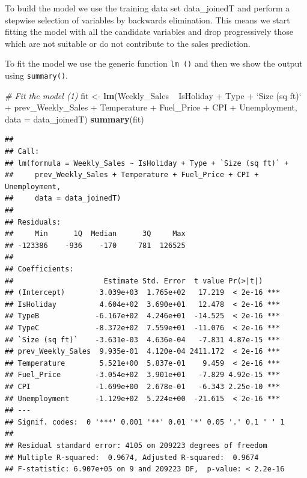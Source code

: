 \documentclass[11pt,]{article}
\newenvironment{Shaded}{\begin{snugshade}}{\end{snugshade}}
\newcommand{\KeywordTok}[1]{\textcolor[rgb]{0.13,0.29,0.53}{\textbf{{#1}}}}
\newcommand{\DataTypeTok}[1]{\textcolor[rgb]{0.13,0.29,0.53}{{#1}}}
\newcommand{\StringTok}[1]{\textcolor[rgb]{0.31,0.60,0.02}{{#1}}}
\newcommand{\CommentTok}[1]{\textcolor[rgb]{0.56,0.35,0.01}{\textit{{#1}}}}
\newcommand{\NormalTok}[1]{{#1}}
\begin{document}
To build the model we use the training data set data\_joinedT and
perform a stepwise selection of variables by backwards elimination. This
means we start fitting the model with all the candidate variables and
drop progressively those which are not suitable or do not contribute to
the sales prediction.

To fit the model we use the generic function \texttt{lm\ ()} and then we
show the output using \texttt{summary()}.

\begin{Shaded}
\begin{Highlighting}[]
\CommentTok{# Fit the model (1)}
\NormalTok{fit <-}\StringTok{ }\KeywordTok{lm}\NormalTok{(Weekly_Sales ~}\StringTok{ }\NormalTok{IsHoliday +}\StringTok{ }\NormalTok{Type +}\StringTok{ `}\DataTypeTok{Size (sq ft)}\StringTok{`} \NormalTok{+}\StringTok{ }
\StringTok{    }\NormalTok{prev_Weekly_Sales +}\StringTok{ }\NormalTok{Temperature +}\StringTok{ }\NormalTok{Fuel_Price +}\StringTok{ }\NormalTok{CPI +}\StringTok{ }\NormalTok{Unemployment, }
    \DataTypeTok{data =} \NormalTok{data_joinedT)}
\KeywordTok{summary}\NormalTok{(fit)}
\end{Highlighting}
\end{Shaded}

\begin{verbatim}
## 
## Call:
## lm(formula = Weekly_Sales ~ IsHoliday + Type + `Size (sq ft)` + 
##     prev_Weekly_Sales + Temperature + Fuel_Price + CPI + Unemployment, 
##     data = data_joinedT)
## 
## Residuals:
##     Min      1Q  Median      3Q     Max 
## -123386    -936    -170     781  126525 
## 
## Coefficients:
##                     Estimate Std. Error  t value Pr(>|t|)    
## (Intercept)        3.039e+03  1.765e+02   17.219  < 2e-16 ***
## IsHoliday          4.604e+02  3.690e+01   12.478  < 2e-16 ***
## TypeB             -6.167e+02  4.246e+01  -14.525  < 2e-16 ***
## TypeC             -8.372e+02  7.559e+01  -11.076  < 2e-16 ***
## `Size (sq ft)`    -3.631e-03  4.636e-04   -7.831 4.87e-15 ***
## prev_Weekly_Sales  9.935e-01  4.120e-04 2411.172  < 2e-16 ***
## Temperature        5.521e+00  5.837e-01    9.459  < 2e-16 ***
## Fuel_Price        -3.054e+02  3.901e+01   -7.829 4.92e-15 ***
## CPI               -1.699e+00  2.678e-01   -6.343 2.25e-10 ***
## Unemployment      -1.129e+02  5.224e+00  -21.615  < 2e-16 ***
## ---
## Signif. codes:  0 '***' 0.001 '**' 0.01 '*' 0.05 '.' 0.1 ' ' 1
## 
## Residual standard error: 4105 on 209223 degrees of freedom
## Multiple R-squared:  0.9674, Adjusted R-squared:  0.9674 
## F-statistic: 6.907e+05 on 9 and 209223 DF,  p-value: < 2.2e-16
\end{verbatim}
\end{document}
